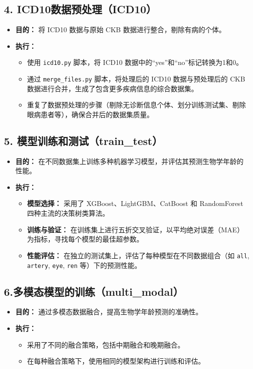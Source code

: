 \documentclass[UTF8]{report}
\theoremstyle{MyLineTheoremStyle} %
\theoremstyle{MyBlockTheoremStyle} %
\theoremstyle{MySubsubsectionStyle} %
\begin{document}
\subsection*{4. ICD10数据预处理（ICD10）}
\begin{itemize}
    \item \textbf{目的：} 将 ICD10 数据与原始 CKB 数据进行整合，剔除有病的个体。
    \item \textbf{执行：}
    \begin{itemize}
        \item 使用 \texttt{icd10.py} 脚本，将 ICD10 数据中的“yes”和“no”标记转换为1和0。
        \item 通过 \texttt{merge\_files.py} 脚本，将处理后的 ICD10 数据与预处理后的 CKB 数据进行合并，生成了包含更多疾病信息的综合数据集。
        \item 重复了数据预处理的步骤（剔除无诊断信息个体、划分训练测试集、剔除眼病患者等），确保合并后的数据集质量。
    \end{itemize}
\end{itemize}

\subsection*{5. 模型训练和测试（train\_test）}
\begin{itemize}
    \item \textbf{目的：} 在不同数据集上训练多种机器学习模型，并评估其预测生物学年龄的性能。
    \item \textbf{执行：}
    \begin{itemize}
        \item \textbf{模型选择：} 采用了 XGBoost、LightGBM、CatBoost 和 RandomForest 四种主流的决策树类算法。
        \item \textbf{训练与验证：} 在训练集上进行五折交叉验证，以平均绝对误差（MAE）为指标，寻找每个模型的最佳超参数。
        \item \textbf{性能评估：} 在独立的测试集上，评估了每种模型在不同数据组合（如 \texttt{all}, \texttt{artery}, \texttt{eye}, \texttt{ren} 等）下的预测性能。
    \end{itemize}
\end{itemize}

\subsection*{6.多模态模型的训练（multi\_modal）}
\begin{itemize}
    \item \textbf{目的：} 通过多模态数据融合，提高生物学年龄预测的准确性。
    \item \textbf{执行：}
    \begin{itemize}
        \item 采用了不同的融合策略，包括中期融合和晚期融合。
        \item 在每种融合策略下，使用相同的模型架构进行训练和评估。
    \end{itemize}
\end{itemize}
\end{document}
